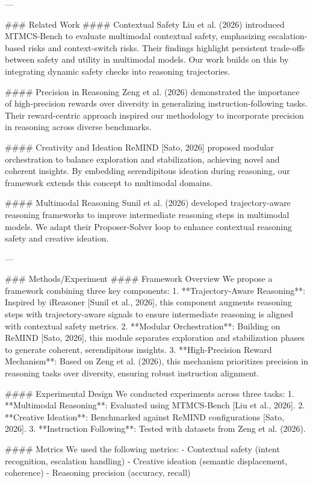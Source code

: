 ---

### Related Work
#### Contextual Safety
Liu et al. (2026) introduced MTMCS-Bench to evaluate multimodal contextual safety, emphasizing escalation-based risks and context-switch risks. Their findings highlight persistent trade-offs between safety and utility in multimodal models. Our work builds on this by integrating dynamic safety checks into reasoning trajectories.

#### Precision in Reasoning
Zeng et al. (2026) demonstrated the importance of high-precision rewards over diversity in generalizing instruction-following tasks. Their reward-centric approach inspired our methodology to incorporate precision in reasoning across diverse benchmarks.

#### Creativity and Ideation
ReMIND [Sato, 2026] proposed modular orchestration to balance exploration and stabilization, achieving novel and coherent insights. By embedding serendipitous ideation during reasoning, our framework extends this concept to multimodal domains.

#### Multimodal Reasoning
Sunil et al. (2026) developed trajectory-aware reasoning frameworks to improve intermediate reasoning steps in multimodal models. We adapt their Proposer-Solver loop to enhance contextual reasoning safety and creative ideation.

---

### Methods/Experiment
#### Framework Overview
We propose a framework combining three key components:
1. **Trajectory-Aware Reasoning**: Inspired by iReasoner [Sunil et al., 2026], this component augments reasoning steps with trajectory-aware signals to ensure intermediate reasoning is aligned with contextual safety metrics.
2. **Modular Orchestration**: Building on ReMIND [Sato, 2026], this module separates exploration and stabilization phases to generate coherent, serendipitous insights.
3. **High-Precision Reward Mechanism**: Based on Zeng et al. (2026), this mechanism prioritizes precision in reasoning tasks over diversity, ensuring robust instruction alignment.

#### Experimental Design
We conducted experiments across three tasks:
1. **Multimodal Reasoning**: Evaluated using MTMCS-Bench [Liu et al., 2026].
2. **Creative Ideation**: Benchmarked against ReMIND configurations [Sato, 2026].
3. **Instruction Following**: Tested with datasets from Zeng et al. (2026).

#### Metrics
We used the following metrics:
- Contextual safety (intent recognition, escalation handling)
- Creative ideation (semantic displacement, coherence)
- Reasoning precision (accuracy, recall)

